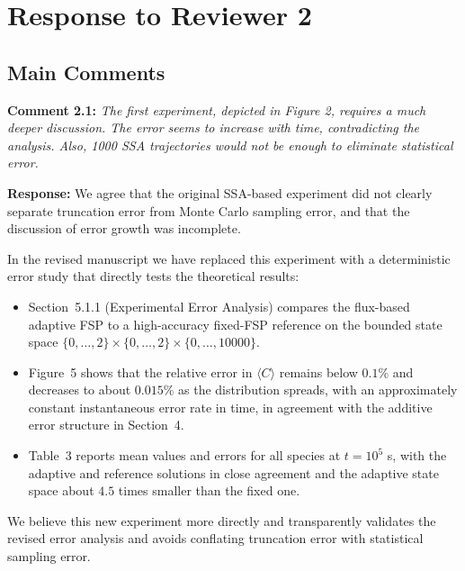 \documentclass[11pt]{article}
\begin{document}
\section*{Response to Reviewer 2}

\subsection*{Main Comments}

\noindent\textbf{Comment 2.1:} \textit{The first experiment, depicted in Figure 2, requires a much deeper
discussion. The error seems to increase with time, contradicting the analysis.
Also, 1000 SSA trajectories would not be enough to eliminate statistical error.}

\textbf{Response:} We agree that the original SSA-based experiment did not clearly
separate truncation error from Monte Carlo sampling error, and that the discussion
of error growth was incomplete.

In the revised manuscript we have replaced this experiment with a deterministic
error study that directly tests the theoretical results:

\begin{itemize}
  \item Section~5.1.1 (Experimental Error Analysis) compares the flux-based
        adaptive FSP to a high-accuracy fixed-FSP reference on the bounded state
        space $\{0,\dots,2\}\times\{0,\dots,2\}\times\{0,\dots,10000\}$.
  \item Figure~5 shows that the relative error in $\langle C\rangle$ remains below
        $0.1\%$ and decreases to about $0.015\%$ as the distribution spreads, with
        an approximately constant instantaneous error rate in time, in agreement
        with the additive error structure in Section~4.
  \item Table~3 reports mean values and errors for all species at $t=10^5$ s, with
        the adaptive and reference solutions in close agreement and the adaptive
        state space about $4.5$ times smaller than the fixed one.
\end{itemize}

We believe this new experiment more directly and transparently validates the
revised error analysis and avoids conflating truncation error with statistical
sampling error.

\medskip
\end{document}
